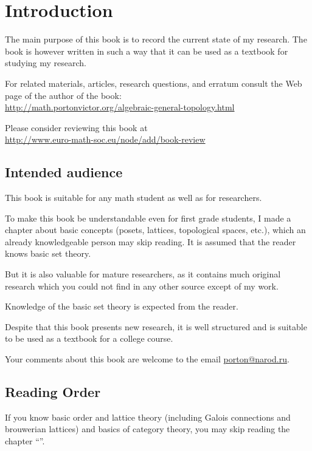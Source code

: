 
\chapter{Introduction}

The main purpose of this book is to record the current state of my
research. The book is however written in such a way that it can be
used as a textbook for studying my research.

For related materials, articles, research questions, and erratum consult
the Web page of the author of the book:\\
\url{http://math.portonvictor.org/algebraic-general-topology.html}

Please consider reviewing this book at\\
\href{http://www.euro-math-soc.eu/node/add/book-review}{http://www.euro-math-soc.eu/node/add/book-review}

\section{Intended audience }

This book is suitable for any math student as well as for researchers.

To make this book be understandable even for first grade students,
I made a chapter about basic concepts (posets, lattices, topological
spaces, etc.), which an already knowledgeable person may skip reading.
It is assumed that the reader knows basic set theory.

But it is also valuable for mature researchers, as it contains much
original research which you could not find in any other source except
of my work.

Knowledge of the basic set theory is expected from the reader.

Despite that this book presents new research, it is well structured
and is suitable to be used as a textbook for a college course.

Your comments about this book are welcome to the email \href{mailto:porton@narod.ru}{porton@narod.ru}.


\section{Reading Order }

If you know basic order and lattice theory (including Galois connections
and brouwerian lattices) and basics of category theory, you may skip
reading the chapter ``''.

